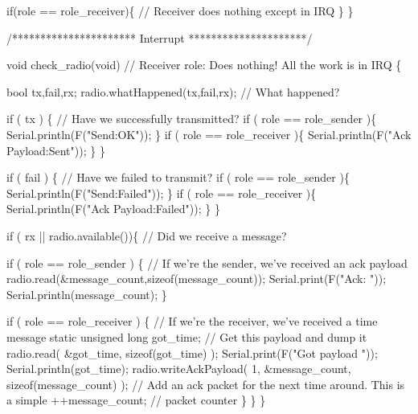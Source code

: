 \begin{DoxyCodeInclude}
  \textcolor{keywordflow}{if}(role == role\_receiver)\{                        \textcolor{comment}{// Receiver does nothing except in IRQ}
  \}  
\}


\textcolor{comment}{/********************** Interrupt *********************/}

\textcolor{keywordtype}{void} check\_radio(\textcolor{keywordtype}{void})                                \textcolor{comment}{// Receiver role: Does nothing!  All the work is in
       IRQ}
\{
  
  \textcolor{keywordtype}{bool} tx,fail,rx;
  radio.whatHappened(tx,fail,rx);                     \textcolor{comment}{// What happened?}
  
  \textcolor{keywordflow}{if} ( tx ) \{                                         \textcolor{comment}{// Have we successfully transmitted?}
      \textcolor{keywordflow}{if} ( role == role\_sender )\{   Serial.println(F(\textcolor{stringliteral}{"Send:OK"})); \}
      \textcolor{keywordflow}{if} ( role == role\_receiver )\{ Serial.println(F(\textcolor{stringliteral}{"Ack Payload:Sent"})); \}
  \}
  
  \textcolor{keywordflow}{if} ( fail ) \{                                       \textcolor{comment}{// Have we failed to transmit?}
      \textcolor{keywordflow}{if} ( role == role\_sender )\{   Serial.println(F(\textcolor{stringliteral}{"Send:Failed"}));  \}
      \textcolor{keywordflow}{if} ( role == role\_receiver )\{ Serial.println(F(\textcolor{stringliteral}{"Ack Payload:Failed"}));  \}
  \}
  
  \textcolor{keywordflow}{if} ( rx || radio.available())\{                      \textcolor{comment}{// Did we receive a message?}
    
    \textcolor{keywordflow}{if} ( role == role\_sender ) \{                      \textcolor{comment}{// If we're the sender, we've received an ack payload}
        radio.read(&message\_count,\textcolor{keyword}{sizeof}(message\_count));
        Serial.print(F(\textcolor{stringliteral}{"Ack: "}));
        Serial.println(message\_count);
    \}

    
    \textcolor{keywordflow}{if} ( role == role\_receiver ) \{                    \textcolor{comment}{// If we're the receiver, we've received a time
       message}
      \textcolor{keyword}{static} \textcolor{keywordtype}{unsigned} \textcolor{keywordtype}{long} got\_time;                  \textcolor{comment}{// Get this payload and dump it}
      radio.read( &got\_time, \textcolor{keyword}{sizeof}(got\_time) );
      Serial.print(F(\textcolor{stringliteral}{"Got payload "}));
      Serial.println(got\_time);
      radio.writeAckPayload( 1, &message\_count, \textcolor{keyword}{sizeof}(message\_count) );  \textcolor{comment}{// Add an ack packet for the next
       time around.  This is a simple}
      ++message\_count;                                \textcolor{comment}{// packet counter}
    \}
  \}
\}
\end{DoxyCodeInclude}
 